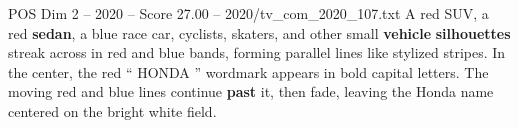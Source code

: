 \begin{textsample}{POS Dim 2 – 2020 – Score 27.00 – 2020/tv\_com\_2020\_107.txt}
A red SUV, a red \textbf{sedan}, a blue race car, cyclists, skaters, and other small \textbf{vehicle} \textbf{silhouettes} streak across in red and blue bands, forming parallel lines like stylized stripes.
In the center, the red “ HONDA ” wordmark appears in bold capital letters.
The moving red and blue lines continue \textbf{past} it, then fade, leaving the Honda name centered on the bright white field.

\end{textsample}
